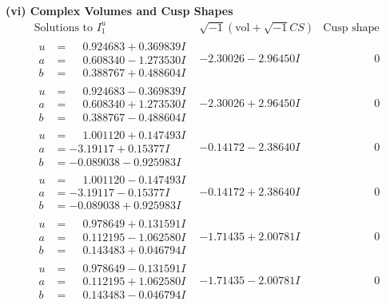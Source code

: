 \documentclass[1p]{elsarticle_modified}
\theoremstyle{definition}
\newcommand{\I}{\sqrt{-1}}
\begin{document}
\newpage\flushleft \textbf{(vi) Complex Volumes and Cusp Shapes}
$$\begin{array}{c|c|c}  
\text{Solutions to }I^u_{1}& \I (\text{vol} + \sqrt{-1}CS) & \text{Cusp shape}\\
 \hline 
\begin{aligned}
u &= \phantom{-}0.924683 + 0.369839 I \\
a &= \phantom{-}0.608340 - 1.273530 I \\
b &= \phantom{-}0.388767 + 0.488604 I\end{aligned}
 & -2.30026 - 2.96450 I & \phantom{-0.000000 } 0 \\ \hline\begin{aligned}
u &= \phantom{-}0.924683 - 0.369839 I \\
a &= \phantom{-}0.608340 + 1.273530 I \\
b &= \phantom{-}0.388767 - 0.488604 I\end{aligned}
 & -2.30026 + 2.96450 I & \phantom{-0.000000 } 0 \\ \hline\begin{aligned}
u &= \phantom{-}1.001120 + 0.147493 I \\
a &= -3.19117 + 0.15377 I \\
b &= -0.089038 - 0.925983 I\end{aligned}
 & -0.14172 - 2.38640 I & \phantom{-0.000000 } 0 \\ \hline\begin{aligned}
u &= \phantom{-}1.001120 - 0.147493 I \\
a &= -3.19117 - 0.15377 I \\
b &= -0.089038 + 0.925983 I\end{aligned}
 & -0.14172 + 2.38640 I & \phantom{-0.000000 } 0 \\ \hline\begin{aligned}
u &= \phantom{-}0.978649 + 0.131591 I \\
a &= \phantom{-}0.112195 - 1.062580 I \\
b &= \phantom{-}0.143483 + 0.046794 I\end{aligned}
 & -1.71435 + 2.00781 I & \phantom{-0.000000 } 0 \\ \hline\begin{aligned}
u &= \phantom{-}0.978649 - 0.131591 I \\
a &= \phantom{-}0.112195 + 1.062580 I \\
b &= \phantom{-}0.143483 - 0.046794 I\end{aligned}
 & -1.71435 - 2.00781 I & \phantom{-0.000000 } 0 \\ \hline\begin{aligned}

\end{aligned}
\end{array}$$
\end{document}
